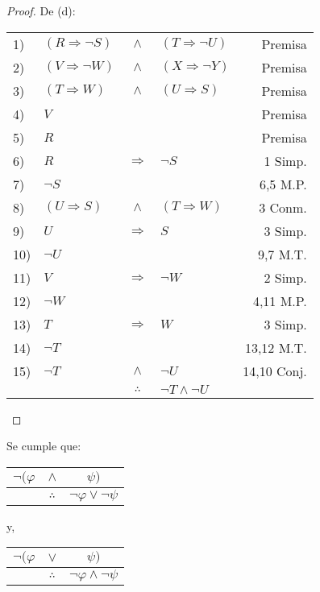 \documentclass[12pt]{report}
\theoremstyle{largebreak}
\begin{document}
\begin{proof}
        De (d):
        \begin{center}
            \begin{tabular}{l l c l r}
                1) & $(R\Rightarrow\neg S)$ & $\land$ & $(T\Rightarrow\neg U)$ & Premisa \\
                2) & $(V\Rightarrow\neg W)$ & $\land$ & $(X\Rightarrow\neg Y)$ & Premisa \\
                3) & $(T\Rightarrow W)$ & $\land$ & $(U\Rightarrow S)$ & Premisa \\
                4) & $V$ &  &  & Premisa \\
                5) & $R$ &  &  & Premisa \\
                6) & $R$ & $\Rightarrow$ & $\neg S$ & 1 Simp. \\
                7) & $\neg S$ &  &  & 6,5 M.P. \\
                8) & $(U\Rightarrow S)$ & $\land$ & $(T\Rightarrow W)$ & 3 Conm. \\
                9) & $U$ & $\Rightarrow$ & $S$ & 3 Simp. \\
                10) & $\neg U$ &  &  & 9,7 M.T. \\
                11) & $V$ & $\Rightarrow$ & $\neg W$ & 2 Simp. \\
                12) & $\neg W$ &  &  & 4,11 M.P. \\
                13) & $T$ & $\Rightarrow$ & $ W$ & 3 Simp. \\
                14) & $\neg T$ &  &  & 13,12 M.T. \\
                15) & $\neg T$ & $\land$ & $\neg U$ & 14,10 Conj. \\
                \hline
                & & $\therefore$ & $\neg T\land\neg U$ & \\
            \end{tabular}
        \end{center}
    \end{proof}

    \begin{propo}
        Se cumple que:
        \begin{center}
            \begin{tabular}{c c c}
                $\neg(\varphi$ & $\land$ & $\psi)$ \\
                \hline
                 & $\therefore$ & $\neg\varphi\lor\neg\psi$ \\
            \end{tabular}
        \end{center}
        y,
        \begin{center}
            \begin{tabular}{c c c}
                $\neg(\varphi$ & $\lor$ & $\psi)$ \\
                \hline
                 & $\therefore$ & $\neg\varphi\land\neg\psi$ \\
            \end{tabular}
        \end{center}
    \end{propo}
\end{document}

